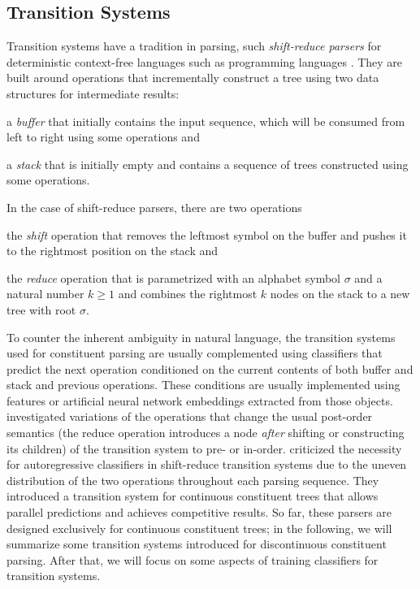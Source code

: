 \documentclass[../document.tex]{subfiles}
\begin{document}
    \subsection{Transition Systems}\label{sec:literature:transition}
    Transition systems have a tradition in parsing, such \emph{shift-reduce parsers} for deterministic context-free languages such as programming languages \citep[Section~4.6]{aho2020compilers}.
    They are built around operations that incrementally construct a tree using two data structures for intermediate results:
    \begin{compactitem}
        \item a \emph{buffer} that initially contains the input sequence, which will be consumed from left to right using some operations and
        \item a \emph{stack} that is initially empty and contains a sequence of trees constructed using some operations.
    \end{compactitem}
    In the case of shift-reduce parsers, there are two operations
    \begin{compactitem}
        \item the \emph{shift} operation that removes the leftmost symbol on the buffer and pushes it to the rightmost position on the stack and
        \item the \emph{reduce} operation that is parametrized with an alphabet symbol \(\sigma\) and a natural number \(k \ge 1\) and combines the rightmost \(k\) nodes on the stack to a new tree with root \(\sigma\).
    \end{compactitem}
    To counter the inherent ambiguity in natural language, the transition systems used for constituent parsing are usually complemented using classifiers that predict the next operation conditioned on the current contents of both buffer and stack and previous operations.
    These conditions are usually implemented using features or artificial neural network embeddings extracted from those objects.
     investigated variations of the operations that change the usual post-order semantics (the reduce operation introduces a node \emph{after} shifting or constructing its children) of the transition system to pre- or in-order.
     criticized the necessity for autoregressive classifiers in shift-reduce transition systems due to the uneven distribution of the two operations throughout each parsing sequence.
    They introduced a transition system for continuous constituent trees that allows parallel predictions and achieves competitive results.
    So far, these parsers are designed exclusively for continuous constituent trees; in the following, we will summarize some transition systems introduced for discontinuous constituent parsing.
    After that, we will focus on some aspects of training classifiers for transition systems.
\end{document}
